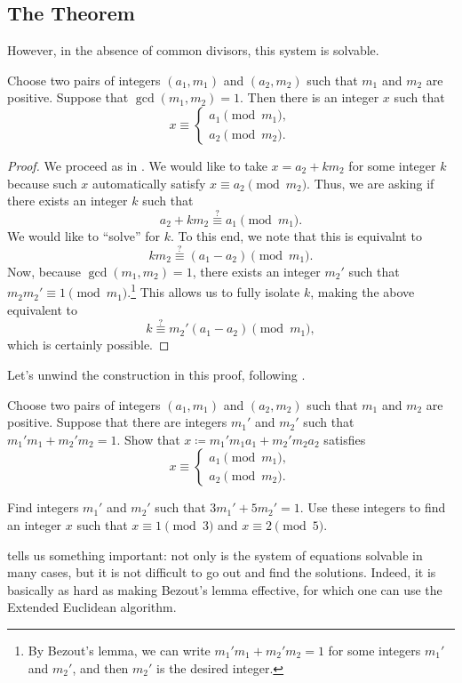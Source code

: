 \documentclass{article}
\begin{document}
\subsection{The Theorem}
However, in the absence of common divisors, this system is solvable.
\begin{theorem} \label{thm:crt-exist}
	Choose two pairs of integers $(a_1,m_1)$ and $(a_2,m_2)$ such that $m_1$ and $m_2$ are positive. Suppose that $\gcd(m_1,m_2)=1$. Then there is an integer $x$ such that
	\[x\equiv\begin{cases}
		a_1 \pmod{m_1}, \\
		a_2 \pmod{m_2}.
	\end{cases}\]
\end{theorem}
\begin{proof}
	We proceed as in . We would like to take $x=a_2+km_2$ for some integer $k$ because such $x$ automatically satisfy $x\equiv a_2\pmod{m_2}$. Thus, we are asking if there exists an integer $k$ such that
	\[a_2+km_2\stackrel?\equiv a_1\pmod{m_1}.\]
	We would like to ``solve'' for $k$. To this end, we note that this is equivalnt to
	\[km_2\stackrel?\equiv(a_1-a_2)\pmod{m_1}.\]
	Now, because $\gcd(m_1,m_2)=1$, there exists an integer $m_2'$ such that $m_2m_2'\equiv1\pmod{m_1}$.\footnote{By Bezout's lemma, we can write $m_1'm_1+m_2'm_2=1$ for some integers $m_1'$ and $m_2'$, and then $m_2'$ is the desired integer.} This allows us to fully isolate $k$, making the above equivalent to
	\[k\stackrel?\equiv m_2'(a_1-a_2)\pmod{m_1},\]
	which is certainly possible.
\end{proof}
Let's unwind the construction in this proof, following .
\begin{exe} \label{exe:solve-crt}
	Choose two pairs of integers $(a_1,m_1)$ and $(a_2,m_2)$ such that $m_1$ and $m_2$ are positive. Suppose that there are integers $m_1'$ and $m_2'$ such that $m_1'm_1+m_2'm_2=1$. Show that $x\coloneqq m_1'm_1a_1+m_2'm_2a_2$ satisfies
	\[x\equiv\begin{cases}
		a_1\pmod{m_1}, \\
		a_2\pmod{m_2}.
	\end{cases}\]
\end{exe}
\begin{exe}
	Find integers $m_1'$ and $m_2'$ such that $3m_1'+5m_2'=1$. Use these integers to find an integer $x$ such that $x\equiv1\pmod3$ and $x\equiv2\pmod5$.	
\end{exe}
\begin{remark}
	 tells us something important: not only is the system of equations solvable in many cases, but it is not difficult to go out and find the solutions. Indeed, it is basically as hard as making Bezout's lemma effective, for which one can use the Extended Euclidean algorithm.
\end{remark}
\end{document}
